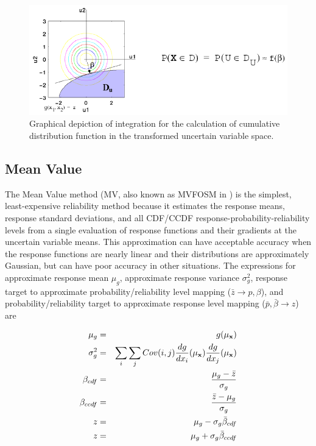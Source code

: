 \begin{figure}
  \centering
  \includegraphics[scale=0.75]{images/cdf_tran_graphic}
  \caption{Graphical depiction of integration for the calculation of
    cumulative distribution function in the transformed uncertain
    variable space.}
  \label{uq:figure06}
\end{figure}

\subsection{Mean Value}\label{uq:reliability:mv}

The Mean Value method (MV, also known as MVFOSM in \cite{Hal00}) is
the simplest, least-expensive reliability method because it estimates
the response means, response standard deviations, and all CDF/CCDF
response-probability-reliability levels from a single evaluation of
response functions and their gradients at the uncertain variable
means.  This approximation can have acceptable accuracy when the
response functions are nearly linear and their distributions are
approximately Gaussian, but can have poor accuracy in other
situations.  The expressions for approximate response mean $\mu_g$,
approximate response variance $\sigma^2_g$, response target to
approximate probability/reliability level mapping ($\bar{z} \to p,\beta$),
and probability/reliability target to approximate response level mapping
($\bar{p},\bar{\beta} \to z$) are

\begin{eqnarray}
\mu_g      & = & g(\mu_{\bf x})  \label{eq:mv_mean1} \\
\sigma^2_g & = & \sum_i \sum_j Cov(i,j) \frac{dg}{dx_i}(\mu_{\bf x})
                 \frac{dg}{dx_j}(\mu_{\bf x}) \label{eq:mv_std_dev} \\
\beta_{cdf}  & = & \frac{\mu_g - \bar{z}}{\sigma_g} \label{eq:mv_ria_cdf} \\
\beta_{ccdf} & = & \frac{\bar{z} - \mu_g}{\sigma_g} \label{eq:mv_ria_ccdf} \\
z        & = & \mu_g - \sigma_g \bar{\beta}_{cdf} \label{eq:mv_pma_cdf} \\
z        & = & \mu_g + \sigma_g \bar{\beta}_{ccdf} \label{eq:mv_pma_ccdf}
\end{eqnarray}

